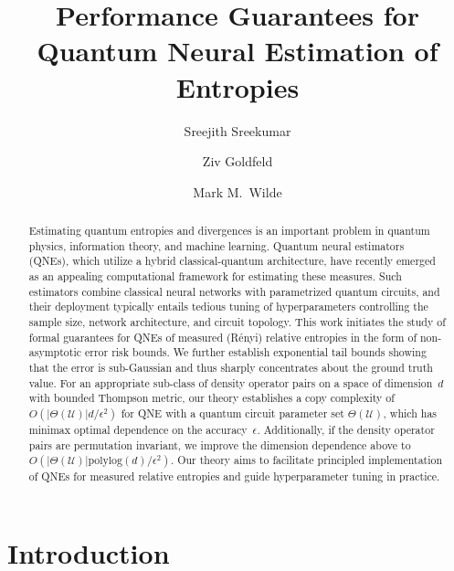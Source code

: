 \documentclass[a4paper,onecolumn,11pt,accepted=2026-05-12]{quantumarticle}
\newcommand{\cU}{\mathcal{U}}
\begin{document}
\title{Performance Guarantees  for Quantum Neural Estimation of Entropies}

\author{Sreejith Sreekumar}
\author{Ziv Goldfeld}
\author{Mark M.~Wilde}

\maketitle

\begin{abstract}
Estimating quantum entropies and divergences is an important problem in quantum physics, information theory, and machine learning. Quantum neural estimators (QNEs), which utilize a hybrid classical-quantum architecture, have recently emerged as an appealing computational framework for estimating these measures. Such estimators combine classical neural networks with parametrized quantum circuits, and their deployment typically entails tedious tuning of hyperparameters controlling the sample size, network architecture, and circuit topology. This work initiates the study of formal guarantees for QNEs of measured (R\'enyi) relative entropies in the form of non-asymptotic error risk bounds. We further establish exponential tail bounds showing that the error is sub-Gaussian and thus sharply concentrates about the ground truth value.  
For an appropriate sub-class of density operator pairs on a space of dimension~$d$ with bounded Thompson metric, our theory establishes a copy complexity of $O(|\Theta(\cU)|d/\epsilon^2)$ for QNE with a quantum circuit parameter set $\Theta(\cU)$, which has minimax optimal dependence on the accuracy~$\epsilon$.  Additionally, if the density operator pairs are permutation invariant, we improve the dimension dependence above to $O(|\Theta(\cU)|\mathrm{polylog}(d)/\epsilon^2)$. Our theory aims to facilitate principled implementation of QNEs for measured relative entropies and guide hyperparameter tuning in practice. 
\end{abstract}

\tableofcontents

\section{Introduction}
\end{document}
